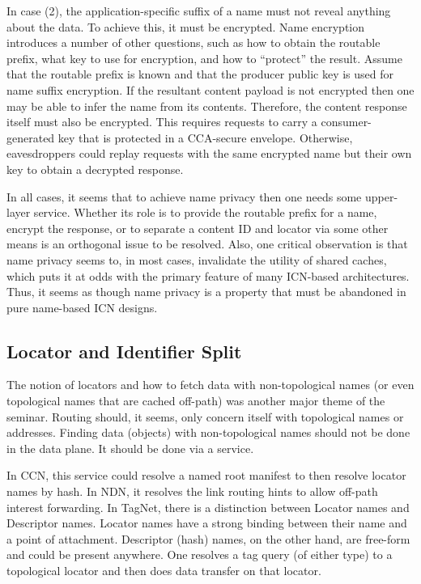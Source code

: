 In case (2), the application-specific suffix of a name must not reveal anything about
the data. To achieve this, it must be encrypted. Name encryption introduces a number
of other questions, such as how to obtain the routable prefix, what key to use for
encryption, and how to ``protect'' the result. Assume that the routable prefix is
known and that the producer public key is used for name suffix encryption. If the
resultant content payload is not encrypted then one may be able to infer the name
from its contents. Therefore, the content response itself must also be encrypted.
This requires requests to carry a consumer-generated key that is protected in a
CCA-secure envelope. Otherwise, eavesdroppers could replay requests with the same
encrypted name but their own key to obtain a decrypted response.

In all cases, it seems that to achieve name privacy then one needs some upper-layer
service. Whether its role is to provide the routable prefix for a name, encrypt the
response, or to separate a content ID and locator via some other means is an orthogonal
issue to be resolved. Also, one critical observation is that name privacy seems to, in most cases, invalidate the utility of
shared caches, which puts it at odds with the primary feature of many ICN-based
architectures. Thus, it seems as though name privacy is a property that must be
abandoned in pure name-based ICN designs.


\subsection{Locator and Identifier Split}
The notion of locators and how to fetch data with non-topological names (or
even topological names that are cached off-path) was another major theme of
the seminar. Routing should, it seems, only concern
itself with topological names or addresses. Finding data (objects) with non-topological
names should not be done in the data plane. It should be done via a service.

In CCN, this service could resolve a named root manifest to then resolve locator names by hash.
In NDN, it resolves the link routing hints to allow off-path interest forwarding. In TagNet,
there is a distinction between Locator names and Descriptor names. Locator names have a
strong binding between their name and a point of attachment. Descriptor (hash) names, on the
other hand, are free-form and could be present anywhere.  One resolves a tag query (of either
type) to a topological locator and then does data transfer on that locator.

